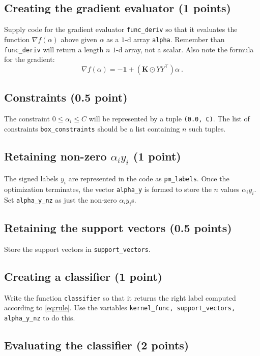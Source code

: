 \documentclass{article}
\begin{document}
\subsection{Creating the gradient evaluator (1 points)}

Supply code for the gradient evaluator {\tt func\_deriv} so that it evaluates the function $\nabla f(\alpha)$ above given $\alpha$ as a $1$-d array {\tt alpha}.
Remember than {\tt func\_deriv} will return a length $n$ $1$-d array, not a scalar. Also note the formula for the gradient:
$$
\nabla f(\alpha) = -\mathbf{1} + (\mathbf{K} \odot YY^\top) \alpha \ .
$$

\subsection{Constraints (0.5 point)}

The constraint $0 \leq \alpha_i \leq C$ will be represented by a tuple {\tt (0.0, C)}. The list of constraints {\tt box\_constraints} should be a list containing
$n$ such tuples.

\subsection{Retaining non-zero $\alpha_i y_i$ (1 point)}

The signed labels $y_i$ are represented in the code as {\tt pm\_labels}. Once the optimization terminates, the vector {\tt alpha\_y} is formed
to store the $n$ values $\alpha_i y_i$. Set {\tt alpha\_y\_nz} as just the non-zero $\alpha_i y_i$s.

\subsection{Retaining the support vectors (0.5 points)}

Store the support vectors in {\tt support\_vectors}.

\subsection{Creating a classifier (1 point)}

Write the function {\tt classifier} so that it returns the right label computed according to \eqref{eq:rule}. Use the variables
{\tt kernel\_func, support\_vectors, alpha\_y\_nz} to do this.

\subsection{Evaluating the classifier (2 points)}
\end{document}

